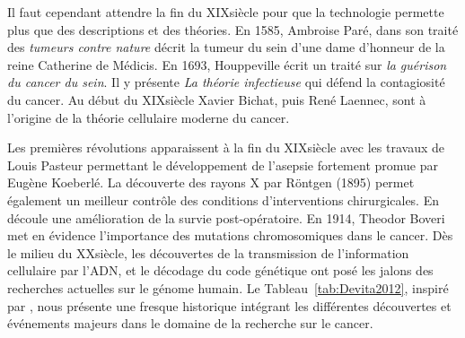 			Il faut cependant attendre la fin du XIX\eme siècle pour que la technologie permette plus que des descriptions et des théories.
			En 1585, Ambroise Paré, dans son traité des \emph{tumeurs contre nature} décrit la tumeur du sein d'une dame d'honneur de la reine Catherine de Médicis.
			En 1693, Houppeville écrit un traité sur \emph{la guérison du cancer du sein}.
			Il y présente \emph{La théorie infectieuse} qui défend la contagiosité du cancer.
			Au début du XIX\eme siècle Xavier Bichat, puis René Laennec, sont à l'origine de la théorie cellulaire moderne du cancer.

			Les premières révolutions apparaissent à la fin du XIX\eme siècle avec les travaux de Louis Pasteur permettant le développement de l'asepsie fortement promue par Eugène Koeberlé.
			La découverte des rayons X par Röntgen (1895) permet également un meilleur contrôle des conditions d'interventions chirurgicales.
			En découle une amélioration de la survie post-opératoire.
			En 1914, Theodor Boveri met en évidence l'importance des mutations chromosomiques dans le cancer.
			Dès le milieu du XX\eme siècle, les découvertes de la transmission de l'information cellulaire par l'\acs{ADN}, et le décodage du code génétique ont posé les jalons des recherches actuelles sur le génome humain.
			Le Tableau~\ref{tab:Devita2012}, inspiré par \citet{Devita2012}, nous présente une fresque historique intégrant les différentes découvertes et événements majeurs dans le domaine de la recherche sur le cancer.


